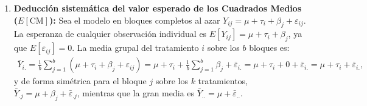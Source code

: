 \begin{solproblema}
	\begin{enumerate}
		\item \textbf{Deducción sistemática del valor esperado de los Cuadrados Medios ($E[\text{CM}]$):}
		Sea el modelo en bloques completos al azar $Y_{ij} = \mu + \tau_i + \beta_j + \varepsilon_{ij}$.
		La esperanza de cualquier observación individual es $E[Y_{ij}] = \mu + \tau_i + \beta_j$, ya que $E[\varepsilon_{ij}] = 0$.
		La media grupal del tratamiento $i$ sobre los $b$ bloques es:
		\begin{align}
			\bar{Y}_{i.} = \frac{1}{b}\sum_{j=1}^b (\mu + \tau_i + \beta_j + \varepsilon_{ij}) = \mu + \tau_i + \frac{1}{b}\sum_{j=1}^b \beta_j + \bar{\varepsilon}_{i.} = \mu + \tau_i + 0 + \bar{\varepsilon}_{i.} = \mu + \tau_i + \bar{\varepsilon}_{i.},
		\end{align}
		y de forma simétrica para el bloque $j$ sobre los $k$ tratamientos, $\bar{Y}_{.j} = \mu + \beta_j + \bar{\varepsilon}_{.j}$, mientras que la gran media es $\bar{Y}_{..} = \mu + \bar{\varepsilon}_{..}$.
		

\end{enumerate}
\end{solproblema}

